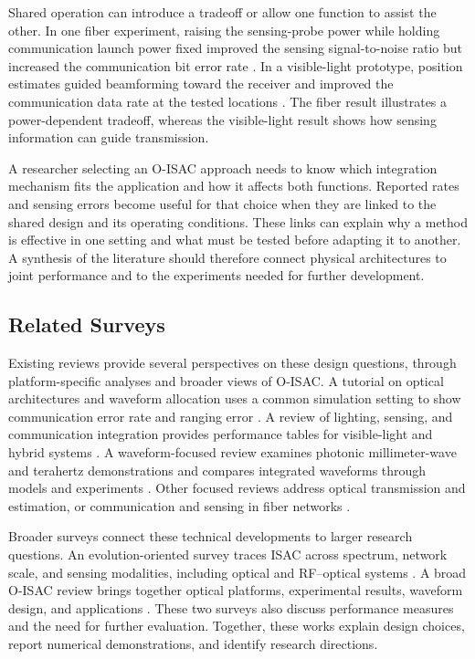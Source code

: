 Shared operation can introduce a tradeoff or allow one function to assist the
other. In one fiber experiment, raising the sensing-probe power while holding
communication launch power fixed improved the sensing signal-to-noise ratio
but increased the communication bit error rate \cite{OISAC_SCR00057}.
In a visible-light prototype, position estimates guided beamforming toward the
receiver and improved the communication data rate at the tested locations
\cite{OISAC_SCR00196}.
The fiber result illustrates a power-dependent tradeoff, whereas the
visible-light result shows how sensing information can guide transmission.

A researcher selecting an O-ISAC approach needs to know which integration
mechanism fits the application and how it affects both functions.
Reported rates and sensing errors become useful for that choice when they
are linked to the shared design and its operating conditions.
These links can explain why a method is effective in one setting and what
must be tested before adapting it to another.
A synthesis of the literature should therefore connect physical architectures
to joint performance and to the experiments needed for further development.

\subsection{Related Surveys}
\label{sec:related_surveys}

Existing reviews provide several perspectives on these design questions,
through platform-specific analyses and broader views of O-ISAC. A tutorial on
optical architectures and waveform allocation
uses a common simulation setting to show communication error rate and ranging
error \cite{Wen2024OISACArchitectures}. A review of lighting, sensing, and
communication integration provides performance tables for visible-light and
hybrid systems \cite{Liang2024LiSACReview}. A waveform-focused review examines
photonic millimeter-wave and terahertz demonstrations and compares integrated
waveforms through models and experiments
\cite{Lyu2026PhotonicTHzWaveforms}. Other focused reviews address optical transmission and
estimation, or communication and sensing in fiber networks
\cite{Su2025OISACTheoryPractice,Khorasgani2026GeneralOpticalISACSurvey,
Liu2026OpticalFiberISACReview,Lu2026ConvergedFiberISACReview}.

Broader surveys connect these technical developments to larger research
questions. An evolution-oriented survey traces ISAC across spectrum, network
scale, and sensing modalities, including optical and RF--optical systems
\cite{Zhang2026ISACEvolution}. A broad O-ISAC review brings together optical
platforms, experimental results, waveform design, and applications
\cite{Mohsan2026OISACReview}. These two surveys also discuss performance
measures and the need for further evaluation.
Together, these works explain design choices, report numerical
demonstrations, and identify research directions.

